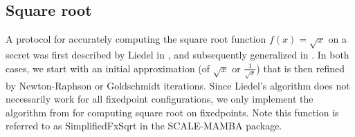 \subsection{Square root}

A protocol for accurately computing the square root function $f(x) = \sqrt{x}$ on a
secret was first described by Liedel in \cite{Liedel2012SecureDC}, and subsequently
generalized in \cite{cryptoeprint:2019:354}. In both cases, we start with an initial
approximation (of $\sqrt{x}$ or $\frac{1}{\sqrt{x}}$) that is then refined by
Newton-Raphson or Goldschmidt iterations. Since Liedel's algorithm does not
necessarily work for all fixedpoint configurations, we only implement the algorithm
from \cite{cryptoeprint:2019:354} for computing square root on fixedpoints. Note this
function is referred to as SimplifiedFxSqrt in the SCALE-MAMBA package.
